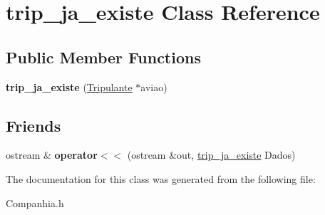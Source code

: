 \hypertarget{classtrip__ja__existe}{
\section{trip\_\-ja\_\-existe Class Reference}
\label{classtrip__ja__existe}
}
\subsection*{Public Member Functions}
\begin{DoxyCompactItemize}
\item 
\hypertarget{classtrip__ja__existe_a996576898f6882492de8e1d2b6287322}{
{\bfseries trip\_\-ja\_\-existe} (\hyperlink{class_tripulante}{Tripulante} $\ast$aviao)}
\label{classtrip__ja__existe_a996576898f6882492de8e1d2b6287322}

\end{DoxyCompactItemize}
\subsection*{Friends}
\begin{DoxyCompactItemize}
\item 
\hypertarget{classtrip__ja__existe_ac8c5957329070a12c2756bafc2429615}{
ostream \& {\bfseries operator$<$$<$} (ostream \&out, \hyperlink{classtrip__ja__existe}{trip\_\-ja\_\-existe} Dados)}
\label{classtrip__ja__existe_ac8c5957329070a12c2756bafc2429615}

\end{DoxyCompactItemize}


The documentation for this class was generated from the following file:\begin{DoxyCompactItemize}
\item 
Companhia.h\end{DoxyCompactItemize}
